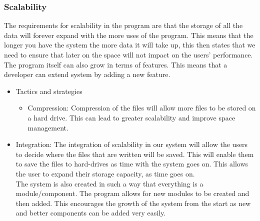 
%

\subsubsection{Scalability}
\begin{flushleft}
The requirements for scalability in the program are that the storage of all the data will forever expand with the more uses of the program. This means that the longer you have the system the more data it will take up, this then states that we need to ensure that later on the space will not impact on the users' performance. The program itself can also grow in terms of features. This means that a developer can extend system by adding a new feature.
\begin{itemize}
\item{Tactics and strategies}
\begin{itemize}
\item{Compression}: Compression of the files will allow more files to be stored on a hard drive. This can lead to greater scalability and improve space management.
\end{itemize}

\item{Integration}: The integration of scalability in our system will allow the users to decide where the files that are written will be saved. This will enable them to save the files to hard-drives as time with the system goes on. This allows the user to expand their storage capacity, as time goes on.\\
The system is also created in such a way that everything is a module/component. The program allows for new modules to be created and then added. This encourages the growth of the system from the start as new and better components can be added very easily.
\end{itemize}

\end{flushleft}
		
